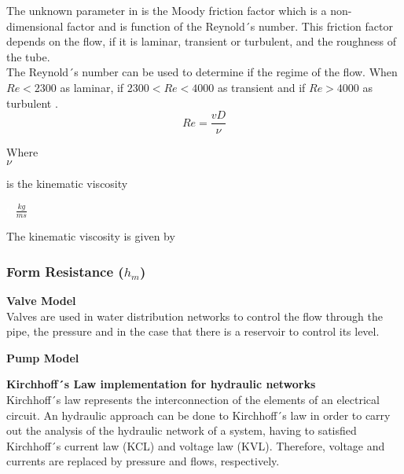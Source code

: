  The unknown parameter in  is the Moody friction factor 
 which is a non-dimensional factor and is function of the Reynold´s number. This friction factor depends on the flow, 
 if it is laminar, transient or turbulent, and the roughness of the tube. \\
 
 
The Reynold´s number can be used to determine if the regime of the flow. When $Re<2300$ as laminar, if $2300<Re<4000$ as transient and if
$Re>4000$ as turbulent \cite{Intro_Fluid}. 
\begin{equation}
   Re = \frac{vD}{\nu}
   \label{Reynolds}
 \end{equation}
 
  \begin{minipage}[t]{0.20\textwidth}
Where\\
\hspace*{8mm} $\nu$ 
\end{minipage}
\begin{minipage}[t]{0.68\textwidth}
\vspace*{2mm}
is the kinematic viscosity

\end{minipage}
\begin{minipage}[t]{0.10\textwidth}
\vspace*{2mm}
\textcolor{White}{te}$\unit{\frac{kg}{ms}}$
\end{minipage}

The kinematic viscosity is given by 
 
 
%
\subsubsection{Form Resistance ($h_m$)} 

\textbf{Valve Model}  \\
\label{ValveModel}
 Valves are used in water distribution networks to control the flow through the pipe, the pressure and in 
 the case that there is a reservoir to control its level. 
 
 \textbf{Pump Model} \\
 \label{PumpModel}
 
 \textbf{Kirchhoff´s Law implementation for hydraulic networks}\\
 \label{KirchhoffLaw}
 Kirchhoff´s law represents the interconnection of the elements of an electrical circuit. An hydraulic approach 
 can be done to Kirchhoff´s law in order to carry out the analysis of the hydraulic network of a system, having to satisfied Kirchhoff´s 
 current law (KCL) and voltage law (KVL). Therefore, voltage and currents are replaced by pressure and flows, respectively. 

